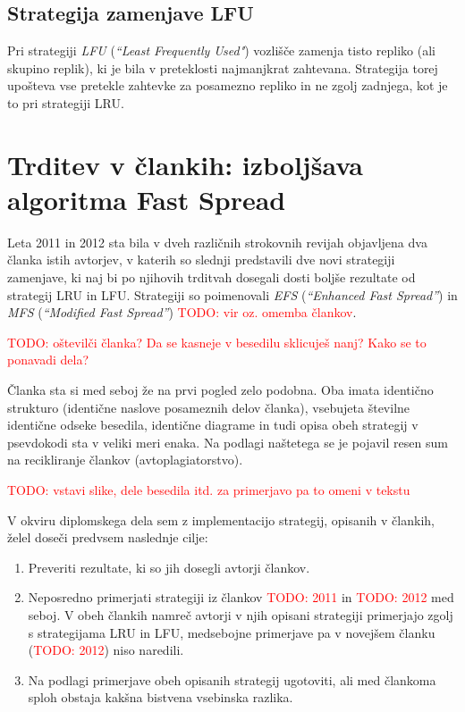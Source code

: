 \documentclass[a4paper, 12pt]{book}
\newcommand{\newterm}{\textit}
\newcommand{\TODO}[1]{\textcolor{red}{TODO: #1}}
\begin{document}
\subsection{Strategija zamenjave LFU}

Pri strategiji \newterm{LFU} (\newterm{``Least Frequently Used"}) vozlišče
zamenja tisto repliko (ali skupino replik), ki je bila v preteklosti
najmanjkrat zahtevana. Strategija torej upošteva vse pretekle zahtevke za
posamezno repliko in ne zgolj zadnjega, kot je to pri strategiji LRU.

\section{Trditev v člankih: izboljšava algoritma Fast Spread}

Leta 2011 in 2012 sta bila v dveh različnih strokovnih revijah objavljena
dva članka istih avtorjev, v katerih so slednji predstavili dve novi
strategiji zamenjave, ki naj bi po njihovih trditvah dosegali dosti boljše
rezultate od strategij LRU in LFU. Strategiji
so poimenovali \newterm{EFS} (\newterm{``Enhanced Fast Spread''}) in
\newterm{MFS} (\newterm{``Modified Fast Spread''})
\TODO{vir oz. omemba člankov}.

\TODO{oštevilči članka? Da se kasneje v besedilu sklicuješ nanj? Kako se
to ponavadi dela?}

Članka sta si med seboj že na prvi pogled zelo podobna. Oba imata identično
strukturo (identične naslove posameznih delov članka), vsebujeta številne
identične odseke besedila, identične diagrame in tudi opisa obeh strategij
v psevdokodi sta v veliki meri enaka. Na podlagi naštetega se je pojavil
resen sum na recikliranje člankov (avtoplagiatorstvo).

\TODO{vstavi slike, dele besedila itd. za primerjavo pa to omeni v tekstu}

V okviru diplomskega dela sem z implementacijo strategij, opisanih v
člankih, želel doseči predvsem naslednje cilje:
\label{cilji}

\begin{enumerate}
\item Preveriti rezultate, ki so jih dosegli avtorji člankov.

\item Neposredno primerjati strategiji iz člankov \TODO{2011} in
\TODO{2012} med seboj. V obeh člankih namreč avtorji v njih opisani
strategiji primerjajo zgolj s strategijama LRU in LFU, medsebojne
primerjave pa v novejšem članku (\TODO{2012}) niso naredili.

\item Na podlagi primerjave obeh opisanih strategij ugotoviti, ali med
člankoma sploh obstaja kakšna bistvena vsebinska razlika.
\end{enumerate}
\end{document}
